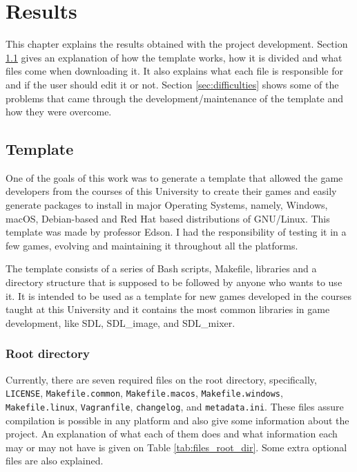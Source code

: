 \chapter[Results]{Results}
\label{sec:results}

This chapter explains the results obtained with the project development. Section \ref{sec:template} gives an explanation of how the template works, how it is divided and what files come when downloading it. It also explains what each file is responsible for and if the user should edit it or not. Section \ref{sec:difficulties} shows some of the problems that came through the development/maintenance of the template and how they were overcome.


\section{Template}
\label{sec:template}

One of the goals of this work was to generate a template that allowed the game developers from the courses of this University to create their games and easily generate packages to install in major Operating Systems, namely, Windows, macOS, Debian-based and Red Hat based distributions of GNU/Linux. This template was made by professor Edson.  I had the responsibility of testing it in a few games, evolving and maintaining it throughout all the platforms.

The template consists of a series of Bash scripts, Makefile, libraries and a directory structure that is supposed to be followed by anyone who wants to use it. It is intended to be used as a template for new games developed in the courses taught at this University and it contains the most common libraries in game development, like SDL, SDL\_image, and SDL\_mixer.

\subsection{Root directory}
\label{sec:root_directory}

Currently, there are seven required files on the root directory, specifically, \texttt{LICENSE}, \texttt{Makefile.common}, \texttt{Makefile.macos}, \texttt{Makefile.windows}, \texttt{Makefile.linux}, \texttt{Vagranfile}, \texttt{changelog}, and \texttt{metadata.ini}. These files assure compilation is possible in any platform and also give some information about the project. An explanation of what each of them does and what information each may or may not have is given on Table \ref{tab:files_root_dir}. Some extra optional files are also explained.


